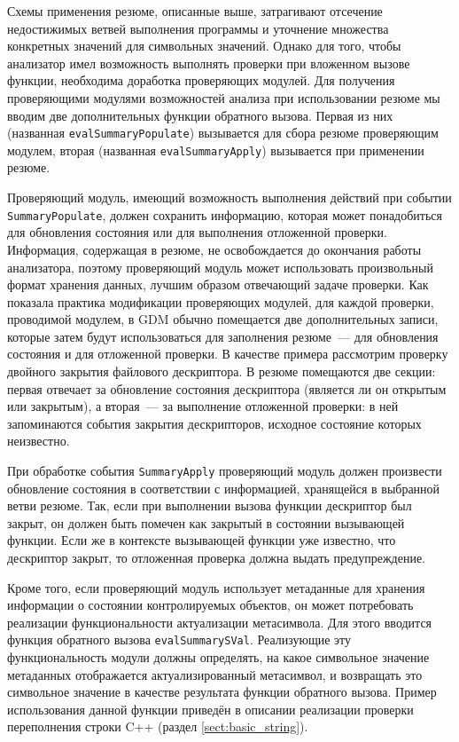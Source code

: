 Схемы применения резюме, описанные выше, затрагивают отсечение недостижимых ветвей выполнения программы и уточнение множества конкретных значений для символьных значений. Однако для того, чтобы анализатор имел возможность выполнять проверки при вложенном вызове функции, необходима доработка проверяющих модулей. Для получения проверяющими модулями возможностей анализа при использовании резюме мы вводим две дополнительных функции обратного вызова. Первая из них (названная \texttt{evalSummaryPopulate}) вызывается для сбора резюме проверяющим модулем, вторая (названная \texttt{evalSummaryApply}) вызывается при применении резюме.

Проверяющий модуль, имеющий возможность выполнения действий при событии \texttt{SummaryPopulate}, должен сохранить информацию, которая может понадобиться для обновления состояния или для выполнения отложенной проверки. Информация, содержащая в резюме, не освобождается до окончания работы анализатора, поэтому проверяющий модуль может использовать произвольный формат хранения данных, лучшим образом отвечающий задаче проверки. Как показала практика модификации проверяющих модулей, для каждой проверки, проводимой модулем, в GDM обычно помещается две дополнительных записи, которые затем будут использоваться для заполнения резюме~--- для обновления состояния и для отложенной проверки. В качестве примера рассмотрим проверку двойного закрытия файлового дескриптора. В резюме помещаются две секции: первая отвечает за обновление состояния дескриптора (является ли он открытым или закрытым), а вторая~--- за выполнение отложенной проверки: в ней запоминаются события закрытия дескрипторов, исходное состояние которых неизвестно.

При обработке события \texttt{SummaryApply} проверяющий модуль должен произвести обновление состояния в соответствии с информацией, хранящейся в выбранной ветви резюме. Так, если при выполнении вызова функции дескриптор был закрыт, он должен быть помечен как закрытый в состоянии вызывающей функции. Если же в контексте вызывающей функции уже известно, что дескриптор закрыт, то отложенная проверка должна выдать предупреждение.

Кроме того, если проверяющий модуль использует метаданные для хранения информации о состоянии контролируемых объектов, он может потребовать реализации функциональности актуализации метасимвола. Для этого вводится функция обратного вызова \texttt{evalSummarySVal}. Реализующие эту функциональность модули должны определять, на какое символьное значение метаданных отображается актуализированный метасимвол, и возвращать это символьное значение в качестве результата функции обратного вызова. Пример использования данной функции приведён в описании реализации проверки переполнения строки C++ (раздел \ref{sect:basic_string}).

